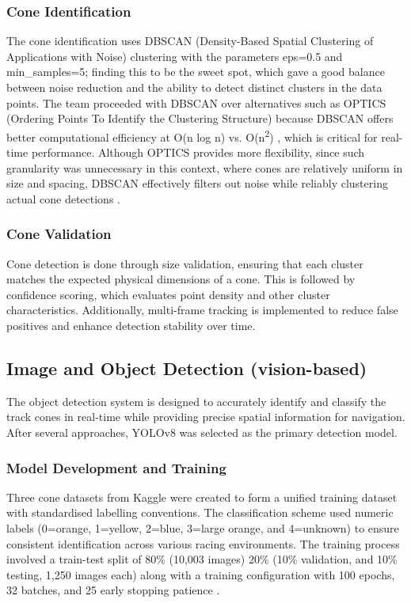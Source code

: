 \documentclass[conference]{IEEEtran}
\begin{document}
\subsubsection{Cone Identification}

The cone identification uses DBSCAN (Density-Based Spatial Clustering of Applications with Noise) clustering with the parameters eps=0.5 and min\_samples=5; finding this to be the sweet spot, which gave a good balance between noise reduction and the ability to detect distinct clusters in the data points. The team proceeded with DBSCAN over alternatives such as OPTICS (Ordering Points To Identify the Clustering Structure) because DBSCAN offers better computational efficiency at O(n log n) vs. O(n\textsuperscript{2}) \cite{b8}, which is critical for real-time performance. Although OPTICS provides more flexibility, since such granularity was unnecessary in this context, where cones are relatively uniform in size and spacing, DBSCAN effectively filters out noise while reliably clustering actual cone detections \cite{b9}.
\vspace{0.2em}
\subsubsection{Cone Validation}
Cone detection is done through size validation, ensuring that each cluster matches the expected physical dimensions of a cone. This is followed by confidence scoring, which evaluates point density and other cluster characteristics. Additionally, multi-frame tracking is implemented to reduce false positives and enhance detection stability over time.

\subsection{Image and Object Detection (vision-based)}
The object detection system is designed to accurately identify and classify the track cones in real-time while providing precise spatial information for navigation. After several approaches, YOLOv8 was selected as the primary detection model.

\subsubsection{Model Development and Training}
Three cone datasets from Kaggle were created to form a unified training dataset with standardised labelling conventions. The classification scheme used numeric labels (0=orange, 1=yellow, 2=blue, 3=large orange, and 4=unknown) to ensure consistent identification across various racing environments. The training process involved a train-test split of 80\% (10,003 images) 20\% (10\% validation, and 10\% testing, 1,250 images each) along with a training configuration with 100 epochs, 32 batches, and 25 early stopping patience \cite{b10}\cite{b11}\cite{b12}. 
\end{document}
